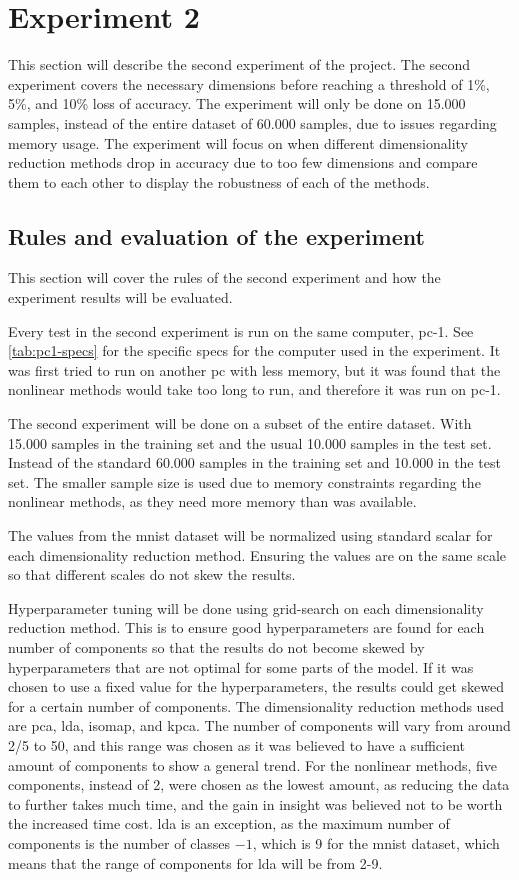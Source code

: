 \section{Experiment 2}\label{sec:experiment-2}
This section will describe the second experiment of the project. The second experiment covers the necessary dimensions before reaching a threshold of 1\%, 5\%, and 10\% loss of accuracy. The experiment will only be done on 15.000 samples, instead of the entire dataset of 60.000 samples, due to issues regarding memory usage. The experiment will focus on when different dimensionality reduction methods drop in accuracy due to too few dimensions and compare them to each other to display the robustness of each of the methods.


\subsection{Rules and evaluation of the experiment}\label{subsec:experiment_2_rules}
This section will cover the rules of the second experiment and how the experiment results will be evaluated.

Every test in the second experiment is run on the same computer, pc-1. See \autoref{tab:pc1-specs} for the specific specs for the computer used in the experiment. It was first tried to run on another pc with less memory, but it was found that the nonlinear methods would take too long to run, and therefore it was run on pc-1.

The second experiment will be done on a subset of the entire dataset. With 15.000 samples in the training set and the usual 10.000 samples in the test set. Instead of the standard 60.000 samples in the training set and 10.000 in the test set. The smaller sample size is used due to memory constraints regarding the nonlinear methods, as they need more memory than was available.

The values from the mnist dataset will be normalized using standard scalar for each dimensionality reduction method. Ensuring the values are on the same scale so that different scales do not skew the results.

Hyperparameter tuning will be done using grid-search on each dimensionality reduction method. This is to ensure good hyperparameters are found for each number of components so that the results do not become skewed by hyperparameters that are not optimal for some parts of the model. If it was chosen to use a fixed value for the hyperparameters, the results could get skewed for a certain number of components.
The dimensionality reduction methods used are \gls{pca}, \gls{lda}, \gls{isomap}, and \gls{kpca}. The number of components will vary from around 2/5 to 50, and this range was chosen as it was believed to have a sufficient amount of components to show a general trend. For the nonlinear methods, five components, instead of 2, were chosen as the lowest amount, as reducing the data to further takes much time, and the gain in insight was believed not to be worth the increased time cost. \gls{lda} is an exception, as the maximum number of components is the number of classes $-1$, which is 9 for the \gls{mnist} dataset, which means that the range of components for \gls{lda} will be from 2-9.

